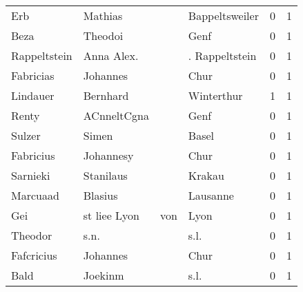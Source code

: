 \begin{center}
\begin{tiny}
\begin{longtabu}{llllrr}
                      Erb &                            Mathias &             &                              Bappeltsweiler &          0 &         1 \\
                     Beza &                            Theodoi &             &                                        Genf &          0 &         1 \\
             Rappeltstein &                         Anna Alex. &             &                              . Rappeltstein &          0 &         1 \\
                Fabricias &                           Johannes &             &                                        Chur &          0 &         1 \\
                 Lindauer &                           Bernhard &             &                                  Winterthur &          1 &         1 \\
                    Renty &                        ACnneltCgna &             &                                        Genf &          0 &         1 \\
                   Sulzer &                              Simen &             &                                       Basel &          0 &         1 \\
                Fabricius &                          Johannesy &             &                                        Chur &          0 &         1 \\
                 Sarnieki &                          Stanilaus &             &                                      Krakau &          0 &         1 \\
                 Marcuaad &                            Blasius &             &                                    Lausanne &          0 &         1 \\
                      Gei &                      st liee  Lyon &         von &                                        Lyon &          0 &         1 \\
                  Theodor &                               s.n. &             &                                        s.l. &          0 &         1 \\
               Fafcricius &                           Johannes &             &                                        Chur &          0 &         1 \\
                     Bald &                            Joekinm &             &                                        s.l. &          0 &         1 \\

\end{longtabu}
\end{tiny}
\end{center}

